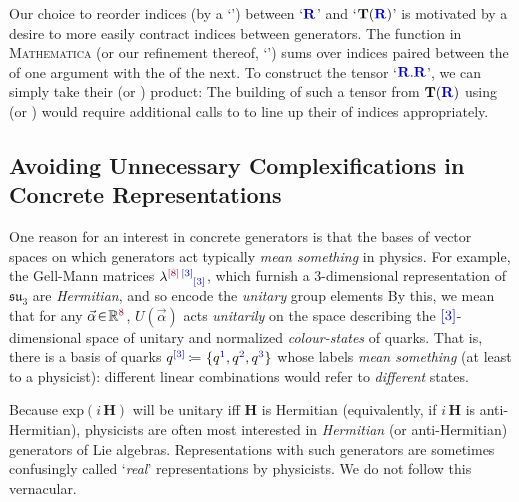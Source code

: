\documentclass[12pt,a4paper]{article}\let\ifpdf\relax
\begin{document}
Our choice to reorder indices (by a `') between `$\mathbf{\b{R}}$' and `$\mathbf{T}(\mathbf{\b{R}})$' is motivated by a desire to more easily contract indices between generators. The function  in \textsc{Mathematica} (or our refinement thereof, `') sums over indices paired between the   of one argument with the   of the next. To construct the tensor `$\mathbf{\b{R}}.\mathbf{\b{R}}$', we can simply take their  (or ) product:
%
\vspace{-4pt}
%
The building of such a tensor from $\mathbf{T}(\mathbf{\b{R}})$ using  (or ) would require additional calls to  to line up their  of indices appropriately. 

\newpage
\subsection{Avoiding Unnecessary Complexifications in Concrete Representations}\label{avoiding_complexity}

One reason for an interest in concrete generators is that the bases of vector spaces on which generators act typically \emph{mean something} in physics. For example, the Gell-Mann matrices $\mathbf{\lambda}\indices{\r{[8]}\,\b{[3]}}{\b{[3]}}$, which furnish a 3-dimensional representation of $\mathfrak{su}_{3}$ \cite{Gell-Mann:1962yej} are \emph{Hermitian}, and so encode the \emph{unitary} group elements
%
% 
By this, we mean that for any $\vec{\alpha}\!\in\!\mathbb{R}^{\r{8}}$, $U(\vec{\alpha})$ acts \emph{unitarily} on the space describing the $\b{[3]}$-dimensional space of unitary and normalized \emph{colour-states} of quarks. That is, there is a basis of quarks $q\indices{\b{[3]}}{}\equivR\{q^{\b{1}},q^{\b{2}},q^{\b{3}}\}$ whose labels \emph{mean something} (at least to a physicist): different linear combinations would refer to \emph{different} states.  

Because $\mathrm{exp}(i\,\mathbf{H})$ will be unitary iff $\mathbf{H}$ is Hermitian (equivalently, if $i\,\mathbf{H}$ is anti-Hermitian), physicists are often most interested in \emph{Hermitian} (or anti-Hermitian) generators of Lie algebras. Representations with such generators are sometimes confusingly called `\emph{real}' representations by physicists. We do not follow this vernacular.
\end{document}
